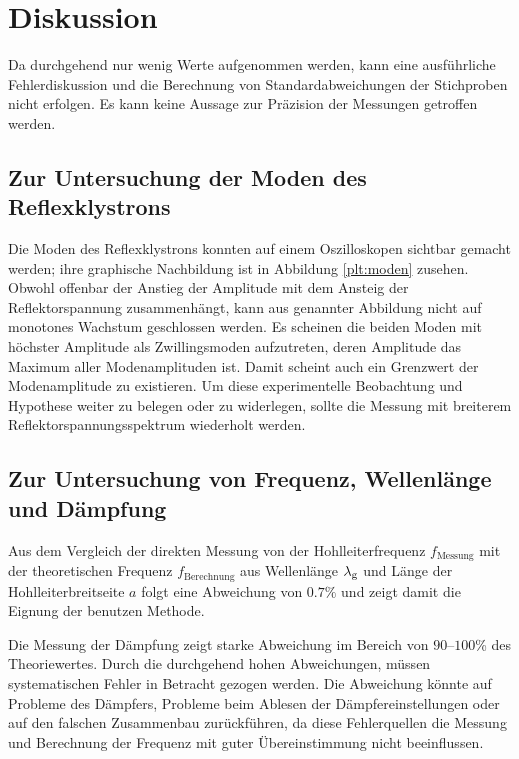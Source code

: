 \section{Diskussion}
\label{sec:Diskussion}
Da durchgehend nur wenig Werte aufgenommen werden, kann eine ausführliche Fehlerdiskussion und die Berechnung von Standardabweichungen der Stichproben nicht erfolgen.
Es kann keine Aussage zur Präzision der Messungen getroffen werden.

\subsection{Zur Untersuchung der Moden des Reflexklystrons}
Die Moden des Reflexklystrons konnten auf einem Oszilloskopen sichtbar gemacht werden;
ihre graphische Nachbildung ist in Abbildung \ref{plt:moden} zusehen.
Obwohl offenbar der Anstieg der Amplitude mit dem Ansteig der Reflektorspannung zusammenhängt, kann aus genannter Abbildung nicht auf monotones Wachstum geschlossen werden.
Es scheinen die beiden Moden mit höchster Amplitude als Zwillingsmoden aufzutreten, deren Amplitude das Maximum  aller Modenamplituden ist.
Damit scheint auch ein Grenzwert der Modenamplitude zu existieren.
Um diese experimentelle Beobachtung und Hypothese weiter zu belegen oder zu widerlegen, sollte die Messung mit breiterem Reflektorspannungsspektrum wiederholt werden.

\subsection{Zur Untersuchung von Frequenz, Wellenlänge und Dämpfung}
Aus dem Vergleich der direkten Messung von der Hohlleiterfrequenz $f_\text{Messung}$ mit der theoretischen Frequenz $f_\text{Berechnung}$ aus Wellenlänge $\lambda_\text g$ und Länge der Hohlleiterbreitseite $a$ folgt eine Abweichung von $0.7\%$ und zeigt damit die Eignung der benutzen Methode.

Die Messung der Dämpfung zeigt starke Abweichung im Bereich von $90$--$100$\% des Theoriewertes.
Durch die durchgehend hohen Abweichungen, müssen systematischen Fehler in Betracht gezogen werden.
Die Abweichung könnte auf Probleme des Dämpfers, Probleme beim Ablesen der Dämpfereinstellungen oder auf den falschen Zusammenbau zurückführen, da diese Fehlerquellen die Messung und Berechnung der Frequenz mit guter Übereinstimmung nicht beeinflussen.

